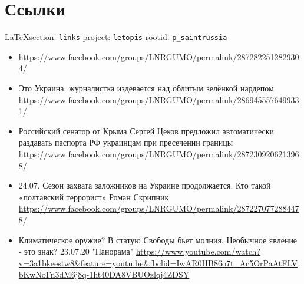  
 
  
\chapter{Ссылки}

\vspace{0.5cm}
{\small\LaTeX section: \verb|links| project: \verb|letopis| rootid: \verb|p_saintrussia|}
\vspace{0.5cm}
  

\begin{itemize}
		\item 
			\url{https://www.facebook.com/groups/LNRGUMO/permalink/2872822512829304/}

		\item Это Украина: журналистка издевается над облитым зелёнкой нардепом 
			\url{https://www.facebook.com/groups/LNRGUMO/permalink/2869455576499331/}

		\item Российский сенатор от Крыма Сергей Цеков предложил автоматически раздавать паспорта РФ украинцам при пресечении границы
						\url{https://www.facebook.com/groups/LNRGUMO/permalink/2872309206213968/}
		\item 24.07. Сезон захвата заложников на Украине продолжается. Кто такой «полтавский террорист» Роман Скрипник
						\url{https://www.facebook.com/groups/LNRGUMO/permalink/2872270772884478/}

		\item Климатическое оружие? В статую Свободы бьет молния. Необычное явление
						- это знак? 23.07.20 "Панорама"
						\url{https://www.youtube.com/watch?v=3a1bkeestw8&feature=youtu.be&fbclid=IwAR0HB86o7t_Ac5OrPaAtFLVbKwNoFn3dM6j8q-1ht40DA8VBUOzlqj4ZDSY}
\end{itemize}


